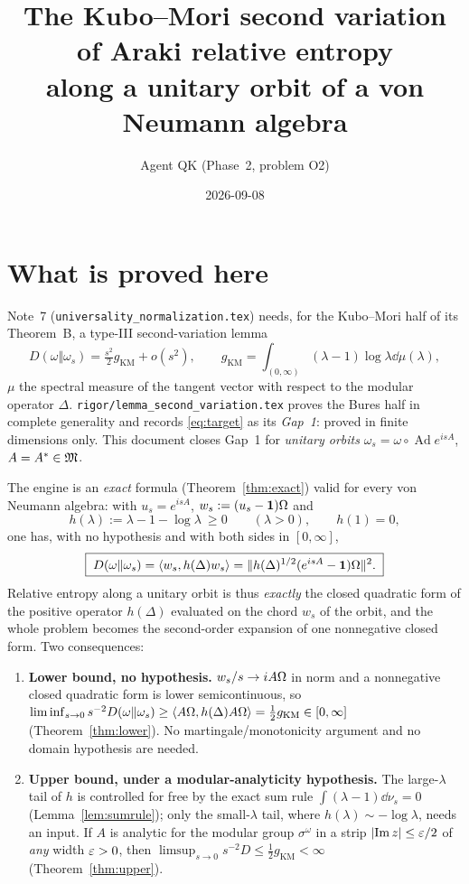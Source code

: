 \documentclass[11pt]{article}
\title{The Kubo--Mori second variation of Araki relative entropy\\ along a unitary orbit of a von Neumann algebra}
\author{Agent QK (Phase~2, problem O2)}
\date{2026-09-08}
\newcommand{\ip}[2]{\langle#1,#2\rangle}\newcommand{\norm}[1]{\lVert#1\rVert}
\newcommand{\gKM}{g_{\mathrm{KM}}}\newcommand{\gB}{g_{\mathrm B}}
\newcommand{\one}{\mathbf 1}\newcommand{\dist}{\operatorname{dist}}
\begin{document}
\maketitle
\tableofcontents

\section{What is proved here}\label{sec:overview}

Note~7 (\texttt{universality\_normalization.tex}) needs, for the Kubo--Mori half of its Theorem~B, a
type-III second-variation lemma
\begin{equation}\label{eq:target}
 D(\omega\Vert\omega_s)=\tfrac{s^2}{2}\gKM+o(s^2),\qquad
 \gKM=\int_{(0,\infty)}(\lambda-1)\log\lambda\dd\mu(\lambda),
\end{equation}
$\mu$ the spectral measure of the tangent vector with respect to the modular operator $\Delta$.
\texttt{rigor/lemma\_second\_variation.tex} proves the Bures half in complete generality and records
\eqref{eq:target} as its \emph{Gap~1}: proved in finite dimensions only.  This document closes Gap~1 for
\emph{unitary orbits} $\omega_s=\omega\circ\operatorname{Ad}e^{isA}$, $A=A^*\in\mathfrak M$.

The engine is an \emph{exact} formula (Theorem~\ref{thm:exact}) valid for every von Neumann algebra:
with $u_s=e^{isA}$, $w_s:=(u_s-\one)\Om$ and
\begin{equation}\label{eq:hdef}
 h(\lambda):=\lambda-1-\log\lambda\ \ge0\qquad(\lambda>0),\qquad h(1)=0,
\end{equation}
one has, with no hypothesis and with both sides in $[0,\infty]$,
\begin{equation}\label{eq:exact}
 \boxed{\;D(\omega\Vert\omega_s)=\ip{w_s}{h(\Delta)w_s}=\norm{h(\Delta)^{1/2}(e^{isA}-\one)\Om}^2 .\;}
\end{equation}
Relative entropy along a unitary orbit is thus \emph{exactly} the closed quadratic form of the positive
operator $h(\Delta)$ evaluated on the chord $w_s$ of the orbit, and the whole problem becomes the
second-order expansion of one nonnegative closed form.  Two consequences:

\begin{enumerate}[leftmargin=1.8em]
\item[(L)] \textbf{Lower bound, no hypothesis.}  $w_s/s\to iA\Omega$ in norm and a nonnegative closed quadratic
 form is lower semicontinuous, so
 \(\liminf_{s\to0}s^{-2}D(\omega\Vert\omega_s)\ge\ip{A\Om}{h(\Delta)A\Om}=\tfrac12\gKM\in[0,\infty]\)
 (Theorem~\ref{thm:lower}).  No martingale/monotonicity argument and no domain hypothesis are needed.
\item[(U)] \textbf{Upper bound, under a modular-analyticity hypothesis.}  The large-$\lambda$ tail of $h$ is
 controlled for free by the exact sum rule $\int(\lambda-1)\dd\nu_s=0$ (Lemma~\ref{lem:sumrule}); only the
 small-$\lambda$ tail, where $h(\lambda)\sim-\log\lambda$, needs an input.  If $A$ is analytic for the modular
 group $\sigma^\omega$ in a strip $\lvert\operatorname{Im}z\rvert\le\varepsilon/2$ of \emph{any} width $\varepsilon>0$, then
 $\limsup_{s\to0}s^{-2}D\le\tfrac12\gKM<\infty$ (Theorem~\ref{thm:upper}).
\end{enumerate}
\end{document}
